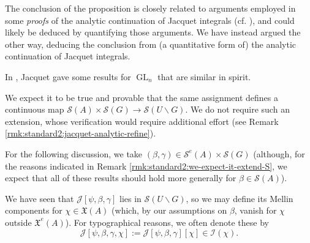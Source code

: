 \documentclass[reqno]{amsart}
\DeclareMathOperator{\GL}{GL}
\theoremstyle{plain} \newtheorem{theorem} {Theorem}
\theoremstyle{definition} \newtheorem{definition} [theorem] {Definition}
\theoremstyle{itplain} %
\numberwithin{equation}{section}
\numberwithin{theorem}{section}
\begin{document}
\begin{remark}
  The conclusion of the proposition is closely related to arguments employed in some \emph{proofs} of the analytic continuation of Jacquet integrals (cf. \cite[Thm 2.1]{MR563369}), and could likely be deduced by quantifying those arguments.  We have instead argued the other way, deducing the conclusion from (a quantitative form of) the analytic continuation of Jacquet integrals.
\end{remark}
\begin{remark}
  In \cite{MR2058615}, Jacquet gave some results for $\GL_n$ that are similar in spirit.
\end{remark}
\begin{remark}\label{rmk:standard2:we-expect-it-extend-S}
  We expect it to be true and provable that the same assignment defines a continuous map $\mathcal{S}(A) \times \mathcal{S}(G) \rightarrow \mathcal{S}(U \backslash G)$.  We do not require such an extension, whose verification would require additional effort (see Remark \ref{rmk:standard2:jacquet-analytic-refine}).
\end{remark}

For the following discussion, we take $(\beta,\gamma) \in \mathcal{S}^e(A) \times \mathcal{S}(G)$ (although, for the reasons indicated in Remark \ref{rmk:standard2:we-expect-it-extend-S}, we expect that all of these results should hold more generally for $\beta \in \mathcal{S}(A)$).

We have seen that $\mathcal{J}[\psi,\beta,\gamma]$ lies in $\mathcal{S}(U \backslash G)$, so we may define its Mellin components for $\chi \in \mathfrak{X}(A)$ (which, by our assumptions on $\beta$, vanish for $\chi$ outside $\mathfrak{X}^e(A)$).  For typographical reasons, we often denote these by
\begin{equation*}
  \mathcal{J}[\psi,\beta,\gamma,\chi] := \mathcal{J}[\psi,\beta,\gamma][\chi] \in \mathcal{I}(\chi).
\end{equation*}
\end{document}
